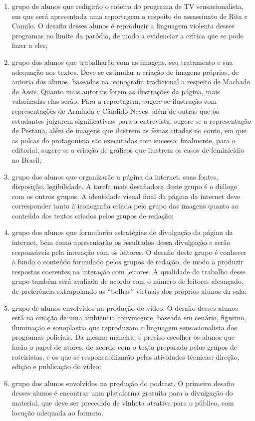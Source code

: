 \documentclass[11pt]{extarticle}
\begin{document}
\begin{enumerate}
\item grupo de alunos que redigirão o roteiro do programa de TV
sensacionalista, em que será apresentada uma reportagem a respeito do
assassinato de Rita e Camilo. O desafio desses alunos é reproduzir a
linguagem violenta desses programas no limite da paródia, de modo a
evidenciar a crítica que se pode fazer a eles;

\item grupo dos alunos que trabalharão com as imagens, seu tratamento e sua
adequação aos textos. Deve-se estimular a criação de imagens próprias,
de autoria dos alunos, baseadas na iconografia tradicional a respeito de
Machado de Assis. Quanto mais autorais forem as ilustrações da página,
mais valorizadas elas serão. Para a reportagem, sugere-se ilustração com
representações de Arminda e Cândido Neves, além de outras que os
estudantes julgarem significativas; para a entrevista, sugere-se a
representação de Pestana, além de imagens que ilustrem as festas citadas
no conto, em que as polcas do protagonista são executadas com sucesso;
finalmente, para o editorial, sugere-se a criação de gráficos que
ilustrem os casos de feminicídio no Brasil;

\item grupo dos alunos que organizarão a página da internet, suas fontes,
disposição, legibilidade. A tarefa mais desafiadora deste grupo é o
diálogo com os outros grupos. A identidade visual final da página da
internet deve corresponder tanto à iconografia criada pelo grupo das
imagens quanto ao conteúdo dos textos criados pelos grupos de redação;

\item grupo dos alunos que formularão estratégias de divulgação da página
da internet, bem como apresentarão os resultados dessa divulgação e
serão responsáveis pela interação com os leitores. O desafio deste grupo
é conhecer a fundo o conteúdo formulado pelos grupos de redação, de modo
a produzir respostas coerentes na interação com leitores. A qualidade do
trabalho desse grupo também será avaliada de acordo com o número de
leitores alcançado, de preferência extrapolando as ``bolhas'' virtuais
dos próprios alunos da sala;

\item grupo de alunos envolvidos na produção do vídeo. O desafio desses
alunos está na criação de uma ambiência convincente, baseada em cenário,
figurino, iluminação e sonoplastia que reproduzam a linguagem sensacionalista
dos programas policiais. Da mesma maneira, é preciso escolher os alunos
que farão o papel de atores, de acordo com o texto preparado pelos
grupos de roteiristas, e os que se responsabilizarão pelas atividades
técnicas: direção, edição e publicação do vídeo;

\item grupo dos alunos envolvidos na produção do podcast. O primeiro
desafio desses alunos é encontrar uma plataforma gratuita para a
divulgação do material, que deve ser precedido de vinheta atrativa para
o público, com locução adequada ao formato.
\end{enumerate}
\end{document}
